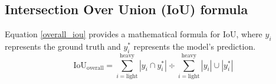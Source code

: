\documentclass{article}
\begin{document}
\subsection{Intersection Over Union (IoU) formula}
Equation \ref{overall_iou} provides a mathematical formula for IoU, where $y_{i}$ represents the ground truth and $y^*_{i}$ represents the model's prediction.
\begin{equation} \label{overall_iou}
    \text{IoU}_{\text{overall}} = {\sum\limits_{i=\text{light}}^{\text{heavy}}|y_{i}\cap y^*_{i}|} \div {\sum\limits_{i=\text{light}}^{\text{heavy}}|y_{i}|\cup|y^*_{i}|}
\end{equation}









\end{document}
